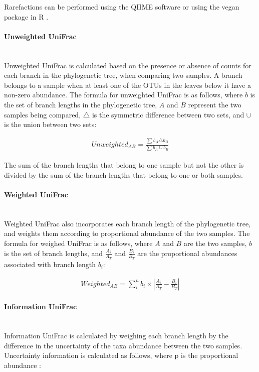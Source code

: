 \documentclass[10pt,letterpaper]{article}
\begin{document}
Rarefactions can be performed using the QIIME software \cite{caporaso2010qiime} or using the vegan package in R \cite{oksanen2007vegan}.

\paragraph{Unweighted UniFrac}\mbox{}\\
Unweighted UniFrac is calculated based on the presence or absence of counts for each branch in the phylogenetic tree, when comparing two samples. A branch belongs to a sample when at least one of the OTUs in the leaves below it have a non-zero abundance. The formula for unweighted UniFrac is as follows, where $b$ is the set of branch lengths in the phylogenetic tree, $A$ and $B$ represent the two samples being compared, $\triangle$ is the symmetric difference between two sets, and $\cup$ is the union between two sets:

\begin{align*}
Unweighted_{AB} = \frac{\sum_{}{} b_{A} \triangle b_{B}}{\sum_{}{} b_{A} \cup b_{B}}
\end{align*}

The sum of the branch lengths that belong to one sample but not the other is divided by the sum of the branch lengths that belong to one or both samples.

\paragraph{Weighted UniFrac}\mbox{}\\
Weighted UniFrac \cite{lozupone2007quantitative} also incorporates each branch length of the phylogenetic tree, and weights them according to proportional abundance of the two samples. The formula for weighed UniFrac is as follows, where $A$ and $B$ are the two samples, $b$ is the set of branch lengths, and $\frac{A_{i}}{A_{T}}$ and $\frac{B_{i}}{B_{T}}$ are the proportional abundances associated with branch length $b_{i}$:

\begin{align*}
Weighted_{AB} = \sum_{i}^{n} b_{i} \times \left| \frac{A_{i}}{A_{T}} - \frac{B_{i}}{B_{T}} \right|
\end{align*}

\paragraph{Information UniFrac}\mbox{}\\
Information UniFrac is calculated by weighing each branch length by the difference in the uncertainty of the taxa abundance between the two samples. Uncertainty information is calculated as follows, where p is the proportional abundance \cite{shannon2001mathematical}:
\end{document}

